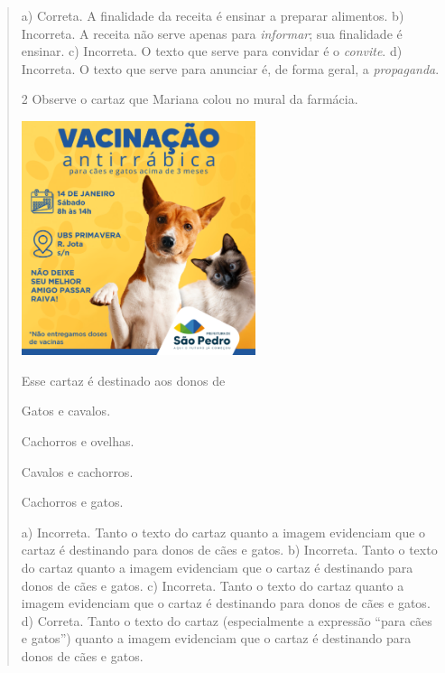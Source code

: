 \begin{verse}
a) Correta. A finalidade da receita é ensinar a preparar alimentos.
b) Incorreta. A receita não serve apenas para \textit{informar}; sua
finalidade é ensinar.  
c) Incorreta. O texto que serve para convidar é o \textit{convite}.
d) Incorreta. O texto que serve para anunciar é, de forma geral, a 
\textit{propaganda}.

\num{2} Observe o cartaz que Mariana colou no mural da farmácia.

\includegraphics[width=2.70149in,height=2.70149in]{media/image115.png}

Esse cartaz é destinado aos donos de 

\begin{minipage}{.5\textwidth}
\begin{escolha}
	\item Gatos e cavalos.

	\item Cachorros e ovelhas.

	\item Cavalos e cachorros.

	\item Cachorros e gatos.
\end{escolha}
\end{minipage}

a) Incorreta. Tanto o texto do cartaz quanto a imagem evidenciam que
o cartaz é destinando para donos de cães e gatos.
b) Incorreta. Tanto o texto do cartaz quanto a imagem evidenciam que
o cartaz é destinando para donos de cães e gatos.
c) Incorreta. Tanto o texto do cartaz quanto a imagem evidenciam que
o cartaz é destinando para donos de cães e gatos.
d) Correta. Tanto o texto do cartaz (especialmente a expressão ``para
cães e gatos'') quanto a imagem evidenciam que o cartaz é destinando para
donos de cães e gatos.


\end{verse}
